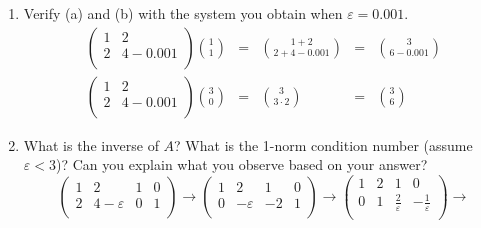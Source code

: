 \documentclass[11pt]{article}
\begin{document}
\begin{enumerate}
\begin{enumerate}
		      \item Verify (a) and (b) with the system you obtain when \(\varepsilon = 0.001\).
		            \begin{align*}
			                     & \left(\begin{array}{cc}
					                             1 & 2       \\
					                             2 & 4-0.001 \\
				                             \end{array}\right)
			            \binom11 &
			            =        & \binom{1+2}{2+4-0.001}  &
			            =        & \binom{3}{6-0.001}      & \\
			                     & \left(\begin{array}{cc}
					                             1 & 2       \\
					                             2 & 4-0.001 \\
				                             \end{array}\right)
			            \binom30 &
			            =        & \binom{3}{3 \cdot 2}    &
			            =        & \binom{3}{6}            &
		            \end{align*}
		      \item What is the inverse of \(A\)?  What is the 1-norm condition number (assume \(\varepsilon < 3\))?  Can you explain what you observe based on your answer?
		            \[
			            \left(\begin{array}{rr|rr}
					            1 & 2             & 1 & 0 \\
					            2 & 4-\varepsilon & 0 & 1 \\
				            \end{array}\right)
			            \to
			            \left(\begin{array}{rr|rr}
					            1 & 2            & 1  & 0 \\
					            0 & -\varepsilon & -2 & 1 \\
				            \end{array}\right)
			            \to
			            \left(\begin{array}{rr|rr}
					            1 & 2 & 1                  & 0                   \\
					            0 & 1 & \tfrac2\varepsilon & -\tfrac1\varepsilon \\
				            \end{array}\right)
			            \to
\]
\end{enumerate}
\end{enumerate}
\end{document}
